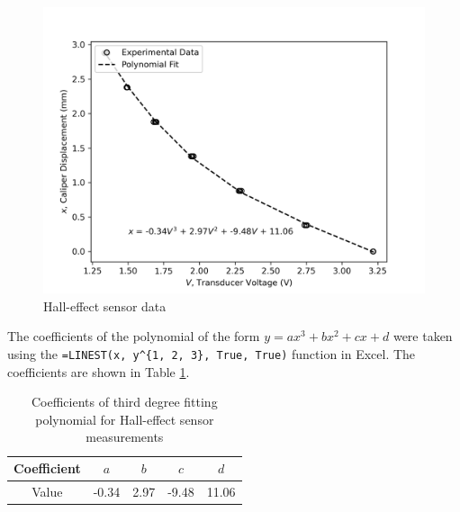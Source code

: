 \section{}
\FloatBarrier
\subsection{}
\begin{figure}[h]
    \centering
    \includegraphics[width=0.8\linewidth]{matplotlib/Q2a.png}
    \caption{Hall-effect sensor data}
    \label{fig:Q2a}
\end{figure}

The coefficients of the polynomial of the form $y = ax^3 + bx^2 + cx + d$ were taken using the \texttt{=LINEST(x, y\string^\{1, 2, 3\}, True, True)} 
function in Excel. The coefficients are shown in Table \ref{tab:Q2a}.

\begin{table}[h]
    \centering
    \caption{Coefficients of third degree fitting polynomial for Hall-effect sensor measurements}
    \label{tab:Q2a}
    \begin{tabular}{ccccc}
        \hline
        Coefficient & $a$ & $b$ & $c$ & $d$ \\
        \hline
        Value & -0.34 & 2.97 & -9.48 & 11.06 \\
        \hline
    \end{tabular}
\end{table}

